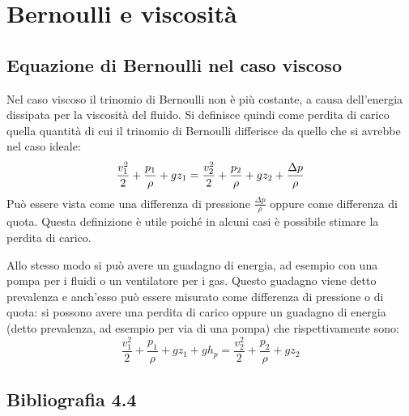 %
\section{Bernoulli e viscosità}

\subsection{Equazione di Bernoulli nel caso viscoso}
Nel caso viscoso il trinomio di Bernoulli non è più costante, a causa dell'energia dissipata per la viscosità del fluido.
Si definisce quindi come perdita di carico quella quantità di cui il trinomio di Bernoulli differisce da quello che si avrebbe nel caso ideale:
%
	\begin{equation*}
		\frac{v_1^2}{2} + \frac{p_1}{\rho} + g z_1 = \frac{v_2^2}{2} + \frac{p_2}{\rho} + g z_2 + \frac{\Delta p}{\rho}\\
	\end{equation*}
%
Può essere vista come una differenza di pressione $\frac{\Delta p}{\rho}$ oppure come differenza di quota.
Questa definizione è utile poiché in alcuni casi è possibile stimare la perdita di carico.

Allo stesso modo si può avere un guadagno di energia, ad esempio con una pompa per i fluidi o un ventilatore per i gas.
Questo guadagno viene detto prevalenza e anch'esso può essere misurato come differenza di pressione o di quota:
si possono avere una perdita di carico oppure un guadagno di energia (detto prevalenza, ad esempio per via di una pompa) che rispettivamente sono:
%
	\begin{equation*}
		\frac{v_1^2}{2} + \frac{p_1}{\rho} + g z_1 + g h_p = \frac{v_2^2}{2} + \frac{p_2}{\rho} + g z_2
	\end{equation*}
%

\subsection*{Bibliografia 4.4}
\cite[Cap.\ 5.4]{CengelCimbala}\\
\cite[Cap.\ 7.4]{PnueliGutfinger}